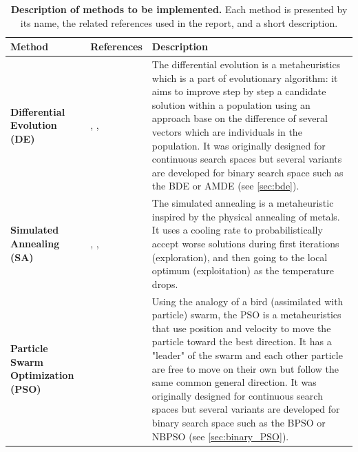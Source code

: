 \documentclass[12pt, openany]{article}
\begin{document}
\begin{table}[H]
    \centering
    \renewcommand{\arraystretch}{1.5}
    \begin{tabularx}{\textwidth}{|>{\centering\arraybackslash}p{4cm}|>{\centering\arraybackslash}p{2.5cm}|X|}
        \hline 
        \textbf{Method} & \textbf{References} & \textbf{Description} \\ \hline

        \textbf{Differential Evolution (DE)} & \cite{storn1997differential}, \cite{przewozniczek_de}, \cite{1688535} & The differential evolution is a metaheuristics which is a part of evolutionary algorithm: it aims to improve step by step a candidate solution within a population using an approach base on the difference of several vectors which are individuals in the population. It was originally designed for continuous search spaces but several variants are developed for binary search space such as the BDE or AMDE (see \ref{sec:bde}).\\ \hdashline

        \textbf{Simulated Annealing (SA)} & \cite{wiki_recuit_simule_fr}, \cite{kirkpatrick1983optimization}, \cite{lacroix2001markov} & The simulated annealing is a metaheuristic inspired by the physical annealing of metals. It uses a cooling rate to probabilistically accept worse solutions during first iterations (exploration), and then going to the local optimum (exploitation) as the temperature drops. \\ \hdashline

        \textbf{Particle Swarm Optimization (PSO)} & \cite{kennedy1995particle, przewozniczek_pso, vandenbergh2006study, kennedy1997discrete,4433821} & Using the analogy of a bird (assimilated with particle) swarm, the PSO is a metaheuristics that use position and velocity to move the particle toward the best direction. It has a "leader" of the swarm and each other particle are free to move on their own but follow the same common general direction. It was originally designed for continuous search spaces but several variants are developed for binary search space such as the BPSO or NBPSO (see \ref{sec:binary_PSO}).\\ 

        \hline
    \end{tabularx}
    \caption{\textbf{Description of methods to be implemented.} Each method is presented by its name, the related references used in the report, and a short description.}
    \label{tab:methods_objectives}
\end{table}
\end{document}
